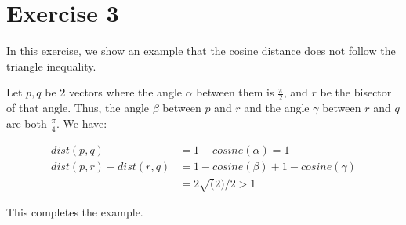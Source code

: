 \section*{Exercise 3}
In this exercise, we show an example that the cosine distance does not follow the triangle inequality.

Let $p,q$ be 2 vectors where the angle $\alpha$ between them is $\frac{\pi}{2}$, and $r$ be the bisector of that angle. Thus, the angle $\beta$ between $p$ and $r$ and
the angle $\gamma$ between $r$ and $q$ are both $\frac{\pi}{4}$. We have:

\begin{align*}
  dist(p,q) &= 1 - cosine(\alpha) = 1 \\
  dist(p,r) + dist(r,q) &= 1 - cosine(\beta) + 1 - cosine(\gamma) \\
  &= 2 \sqrt(2) / 2 > 1
\end{align*}

This completes the example.
